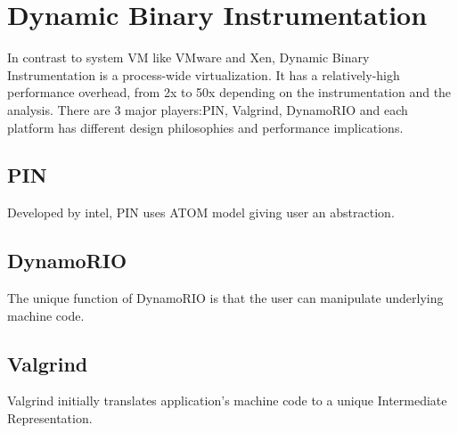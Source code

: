 \section{Dynamic Binary Instrumentation}
\label{sec:overview}
In contrast to system VM like VMware and Xen, Dynamic Binary Instrumentation is a process-wide virtualization. It has a relatively-high performance overhead, from 2x to 50x depending on the instrumentation and the analysis. There are 3 major players:PIN, Valgrind, DynamoRIO and each platform has different design philosophies and performance implications.
\subsection{PIN}
Developed by intel, PIN uses ATOM model giving user an abstraction.
\subsection{DynamoRIO}
The unique function of DynamoRIO is that the user can manipulate underlying machine code.
\subsection{Valgrind}
Valgrind initially translates application's machine code to a unique Intermediate Representation.
